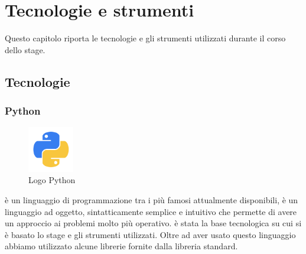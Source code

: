 
\hypertarget{(chap:capitolo6)}{}
\chapter{Tecnologie e strumenti}
Questo capitolo riporta le tecnologie e gli strumenti utilizzati durante il corso dello stage.
\section{Tecnologie}
\subsection{Python}
\begin{figure}[H]
	\begin{center} \includegraphics[width=2cm]{figures/python}
		\caption[Logo Python]{Logo Python}  
	\end{center}
\end{figure}
 è un linguaggio di programmazione tra i più famosi attualmente disponibili, è un linguaggio ad oggetto, sintatticamente semplice e intuitivo che permette di avere un approccio ai problemi molto più operativo.  è stata la base tecnologica su cui si è basato lo stage e gli strumenti utilizzati. Oltre ad aver usato questo linguaggio abbiamo utilizzato alcune librerie fornite dalla libreria standard.

